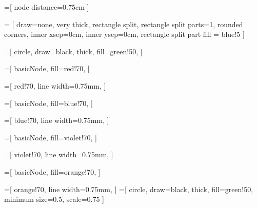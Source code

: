 
  
\usetikzlibrary{positioning}
\usetikzlibrary{shapes.geometric}
\usetikzlibrary{arrows}
\usetikzlibrary{arrows.meta}
\usetikzlibrary{fit}
\usetikzlibrary{calc}
\usetikzlibrary{matrix}
\usetikzlibrary{graphs, graphs.standard, quotes}
\usetikzlibrary{babel}

=[
	node distance=0.75cm
]

 = [
draw=none, very thick,
rectangle split, rectangle split parts=1, rounded corners, inner xsep=0cm, inner ysep=0cm,
rectangle split part fill = {blue!5}
]


=[
	circle, 
	draw=black,
	thick,
	fill=green!50,
]

=[
basicNode,
fill=red!70,	
]

=[
red!70,	
line width=0.75mm,
]

=[
basicNode,
fill=blue!70,	
]

=[
blue!70,	
line width=0.75mm,
]

=[
basicNode,
fill=violet!70,	
]

=[
violet!70,	
line width=0.75mm,
]

=[
basicNode,
fill=orange!70,	
]

=[
orange!70,	
line width=0.75mm,
]
=[
circle, 
draw=black,
thick,
fill=green!50,
minimum size=0.5,
scale=0.75
]

